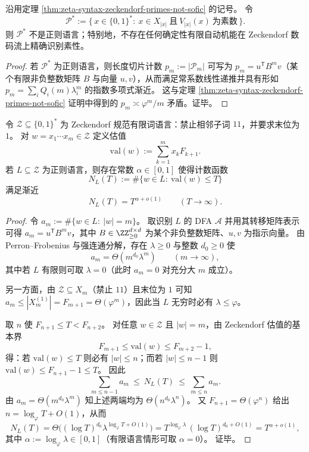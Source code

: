 \begin{corollary}\label{cor:zeta-syntax-zeckendorf-primes-not-regular}
沿用定理 \ref{thm:zeta-syntax-zeckendorf-primes-not-sofic} 的记号。
令
\[
\mathcal P^{\ast}:=\{\,x\in\{0,1\}^{\ast}:\ x\in X_{|x|}\ \text{且}\ V_{|x|}(x)\ \text{为素数}\,\}.
\]
则 \(\mathcal P^{\ast}\) 不是正则语言；特别地，不存在任何确定性有限自动机能在 Zeckendorf 数码流上精确识别素性。
\end{corollary}
\begin{proof}
若 \(\mathcal P^{\ast}\) 为正则语言，则长度切片计数 \(p_m:=|\mathcal P_m|\) 可写为 \(p_m=u^{\mathsf T}B^m v\)（某个有限非负整数矩阵 \(B\) 与向量 \(u,v\)），从而满足常系数线性递推并具有形如
\(
p_m=\sum_i Q_i(m)\lambda_i^m
\)
的指数多项式渐近。
这与定理 \ref{thm:zeta-syntax-zeckendorf-primes-not-sofic} 证明中得到的
\(
p_m\asymp \varphi^m/m
\)
矛盾。证毕。
\end{proof}

\begin{theorem}\label{thm:zeta-syntax-zeckendorf-regular-valuation-powerlaw}
令 \(\mathcal Z\subseteq\{0,1\}^\ast\) 为 Zeckendorf 规范有限词语言：禁止相邻子词 \(11\)，并要求末位为 \(1\)。
对 \(w=x_1\cdots x_m\in\mathcal Z\) 定义估值
\[
\mathrm{val}(w):=\sum_{k=1}^{m}x_k F_{k+1}.
\]
若 \(L\subseteq\mathcal Z\) 为正则语言，则存在常数 \(\alpha\in[0,1]\) 使得计数函数
\[
N_L(T):=\#\{w\in L:\ \mathrm{val}(w)\le T\}
\]
满足渐近
\[
N_L(T)=T^{\alpha+o(1)}\qquad(T\to\infty).
\]
\end{theorem}
\begin{proof}
令 \(a_m:=\#\{w\in L:\ |w|=m\}\)。
取识别 \(L\) 的 DFA \(\mathcal A\) 并用其转移矩阵表示可得 \(a_m=u^{\mathsf T}B^m v\)，其中 \(B\in\ZZ_{\ge 0}^{d\times d}\) 为某个非负整数矩阵、\(u,v\) 为指示向量。
由 Perron--Frobenius 与强连通分解，存在 \(\lambda\ge 0\) 与整数 \(d_0\ge 0\) 使
\[
a_m=\Theta(m^{d_0}\lambda^m)\qquad(m\to\infty),
\]
其中若 \(L\) 有限则可取 \(\lambda=0\)（此时 \(a_m=0\) 对充分大 \(m\) 成立）。
\par
另一方面，由 \(\mathcal Z\subseteq X_m\)（禁止 \(11\)）且末位为 \(1\) 可知 \(a_m\le |X_m^{(1)}|=F_{m+1}=\Theta(\varphi^m)\)，因此当 \(L\) 无穷时必有 \(\lambda\le \varphi\)。
\par
取 \(n\) 使 \(F_{n+1}\le T<F_{n+2}\)。
对任意 \(w\in\mathcal Z\) 且 \(|w|=m\)，由 Zeckendorf 估值的基本界
\[
F_{m+1}\le \mathrm{val}(w)\le F_{m+2}-1,
\]
得：若 \(\mathrm{val}(w)\le T\) 则必有 \(|w|\le n\)；而若 \(|w|\le n-1\) 则 \(\mathrm{val}(w)\le F_{n+1}-1\le T\)。
因此
\[
\sum_{m\le n-1}a_m\ \le\ N_L(T)\ \le\ \sum_{m\le n}a_m.
\]
由 \(a_m=\Theta(m^{d_0}\lambda^m)\) 知上述两端均为 \(\Theta(n^{d_0}\lambda^n)\)。
又 \(F_{n+1}=\Theta(\varphi^n)\) 给出 \(n=\log_\varphi T+O(1)\)，从而
\[
N_L(T)=\Theta\!\bigl((\log T)^{d_0}\lambda^{\log_\varphi T+O(1)}\bigr)
=T^{\log_\varphi\lambda}\,(\log T)^{d_0+O(1)}
=T^{\alpha+o(1)},
\]
其中 \(\alpha:=\log_\varphi\lambda\in[0,1]\)（有限语言情形可取 \(\alpha=0\)）。
证毕。
\end{proof}

